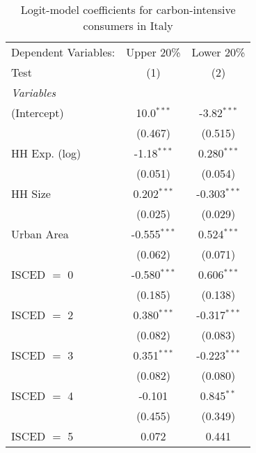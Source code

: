 
\begin{table}[htbp!]
   \centering
   \small
   \begin{adjustbox}{width = 1\textwidth, max height = 0.95\textheight, center}
      \begin{threeparttable}[b]
         \caption{\label{tab:Logit_1_ITA} Logit-model coefficients for carbon-intensive consumers in Italy}
         \begin{tabular}{lcc}
            \tabularnewline \midrule \midrule
            Dependent Variables: & Upper 20\%     & Lower 20\%\\   
            Test                 & (1)            & (2)\\  
            \midrule
            \emph{Variables}\\
            (Intercept)          & 10.0$^{***}$   & -3.82$^{***}$\\   
                                 & (0.467)        & (0.515)\\   
            HH Exp. (log)        & -1.18$^{***}$  & 0.280$^{***}$\\   
                                 & (0.051)        & (0.054)\\   
            HH Size              & 0.202$^{***}$  & -0.303$^{***}$\\   
                                 & (0.025)        & (0.029)\\   
            Urban Area           & -0.555$^{***}$ & 0.524$^{***}$\\   
                                 & (0.062)        & (0.071)\\   
            ISCED $=$ 0          & -0.580$^{***}$ & 0.606$^{***}$\\   
                                 & (0.185)        & (0.138)\\   
            ISCED $=$ 2          & 0.380$^{***}$  & -0.317$^{***}$\\   
                                 & (0.082)        & (0.083)\\   
            ISCED $=$ 3          & 0.351$^{***}$  & -0.223$^{***}$\\   
                                 & (0.082)        & (0.080)\\   
            ISCED $=$ 4          & -0.101         & 0.845$^{**}$\\   
                                 & (0.455)        & (0.349)\\   
            ISCED $=$ 5          & 0.072          & 0.441\\   

\end{tabular}
\end{threeparttable}
\end{adjustbox}
\end{table}
